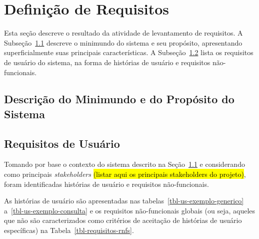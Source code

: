 \chapter{Definição de Requisitos}
\label{sec-requisitos}
\vspace{-1cm}

Esta seção descreve o resultado da atividade de levantamento de requisitos.
A Subseção~\ref{sec-requisitos-minimundo} descreve o minimundo do sistema e seu propósito, apresentando superficialmente suas principais características. 
A Subseção~\ref{sec-requisitos-usuario} lista os requisitos de usuário do sistema, na forma de histórias de usuário e requisitos não-funcionais. 




\section{Descrição do Minimundo e do Propósito do Sistema}
\label{sec-requisitos-minimundo}




\section{Requisitos de Usuário}
\label{sec-requisitos-usuario}


Tomando por base o contexto do sistema descrito na Seção~\ref{sec-requisitos-minimundo} e considerando como principais \textit{stakeholders} \hl{(listar aqui os principais stakeholders do projeto)}, foram identificadas histórias de usuário e requisitos não-funcionais.

As histórias de usuário são apresentadas nas tabelas~\ref{tbl-us-exemplo-generico} a~\ref{tbl-us-exemplo-consulta} e os requisitos não-funcionais globais (ou seja, aqueles que não são caracterizados como critérios de aceitação de histórias de usuário específicas) na Tabela~\ref{tbl-requisitos-rnfs}.


